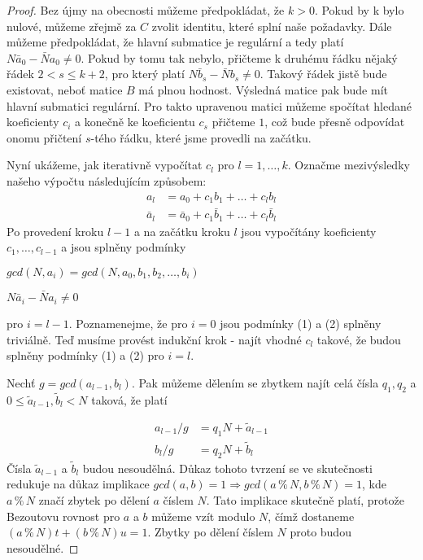 \begin{proof}
Bez újmy na obecnosti můžeme předpokládat, že $ k > 0 $. Pokud by k bylo nulové,
můžeme zřejmě za $ C $ zvolit identitu, které splní naše požadavky.
Dále můžeme předpokládat, že hlavní submatice je regulární a tedy platí
$ N \bar{a}_0 - \bar{N} a_0 \neq 0 $. Pokud by tomu tak nebylo, přičteme k druhému
řádku nějaký řádek $ 2 < s \leq k + 2 $, pro který platí
$ N \bar{b}_s - \bar{N} b_s \neq 0 $.
Takový řádek jistě bude existovat, neboť matice $ B $ má plnou hodnost. Výsledná
matice pak bude mít hlavní submatici regulární. Pro takto upravenou matici můžeme
spočítat hledané koeficienty $ c_i $ a konečně ke koeficientu $ c_s $ přičteme $ 1 $,
což bude přesně odpovídat onomu přičtení $ s $-tého řádku, které jsme provedli na
začátku.

Nyní ukážeme, jak iterativně vypočítat $ c_l $ pro $ l = 1,\dots,k $. Označme
mezivýsledky našeho výpočtu následujícím způsobem:
\begin{equation}\label{oznac}
    \begin{split}
        a_l &= a_0 + c_1 b_1 + \dots + c_l b_l \\
        \bar{a}_l &= \bar{a}_0 + c_1 \bar{b}_1 +\dots+c_l \bar{b}_l
    \end{split}
\end{equation}
Po provedení kroku $ l-1 $ a na začátku kroku $ l $ jsou vypočítány koeficienty
$ c_1, \dots, c_{l-1} $ a jsou splněny podmínky
\begin{center}
    \begin{CondNum}
        \item $ gcd(N, a_i) = gcd(N, a_0, b_1, b_2, \dots, b_i) $
        \item $ N \bar{a}_i - \bar{N} a_i \neq 0 $
    \end{CondNum}
\end{center}
pro $ i = l - 1 $. Poznamenejme, že pro $ i = 0 $ jsou podmínky (1)
a (2) splněny triviálně. Teď musíme provést
indukční krok - najít vhodné $ c_l $ takové, že budou splněny podmínky
(1) a (2) pro $ i = l $.

Nechť $ g = gcd(a_{l-1}, b_l) $. Pak můžeme dělením se zbytkem najít celá
čísla $ q_1, q_2 $ a
$ 0 \leq \tilde{a}_{l-1}, \tilde{b}_{l} < N $ taková, že platí

\begin{equation}\label{division}
    \begin{split}
        a_{l - 1} / g & = q_1 N +  \tilde{a}_{l-1} \\
        b_{l} / g & = q_2 N +  \tilde{b}_{l}
    \end{split}
\end{equation}
Čísla $ \tilde{a}_{l-1} $ a $ \tilde{b}_{l} $ budou nesoudělná. Důkaz tohoto
tvrzení se ve skutečnosti redukuje na důkaz implikace
$ gcd(a,b) = 1 \Rightarrow gcd(a \mathbin{\%} N, b \mathbin{\%} N) = 1 $, kde
$ a \mathbin{\%} N $ značí zbytek po dělení $ a $ číslem $ N $. Tato implikace
skutečně platí, protože Bezoutovu rovnost pro $ a $ a $ b $ můžeme vzít modulo
$ N $, čímž dostaneme $ (a \mathbin{\%} N) t + (b \mathbin{\%} N) u = 1 $. Zbytky
po dělení číslem $ N $ proto budou nesoudělné.


\end{proof}
